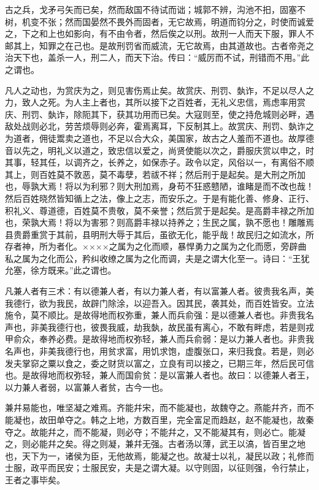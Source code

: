 \documentclass[]{article}
\begin{document}
古之兵，戈矛弓矢而已矣，然而敌国不待试而诎；城郭不辨，沟池不抇，固塞不树，机变不张；然而国晏然不畏外而固者，无它故焉，明道而钧分之，时使而诚爱之，下之和上也如影向，有不由令者，然后俟之以刑。故刑一人而天下服，罪人不邮其上，知罪之在己也。是故刑罚省而威流，无它故焉，由其道故也。古者帝尧之治天下也，盖杀一人，刑二人，而天下治。传曰：``威厉而不试，刑错而不用。''此之谓也。

凡人之动也，为赏庆为之，则见害伤焉止矣。故赏庆、刑罚、埶诈，不足以尽人之力，致人之死。为人主上者也，其所以接下之百姓者，无礼义忠信，焉虑率用赏庆、刑罚、埶诈，除阨其下，获其功用而已矣。大寇则至，使之持危城则必畔，遇敌处战则必北，劳苦烦辱则必奔，霍焉离耳，下反制其上。故赏庆、刑罚、埶诈之为道者，佣徒鬻卖之道也，不足以合大众，美国家，故古之人羞而不道也。故厚德音以先之，明礼义以道之，致忠信以爱之，尚贤使能以次之，爵服庆赏以申之，时其事，轻其任，以调齐之，长养之，如保赤子。政令以定，风俗以一，有离俗不顺其上，则百姓莫不敦恶，莫不毒孽，若祓不祥；然后刑于是起矣。是大刑之所加也，辱孰大焉！将以为利邪？则大刑加焉，身苟不狂惑戆陋，谁睹是而不改也哉！然后百姓晓然皆知循上之法，像上之志，而安乐之。于是有能化善、修身、正行、积礼义、尊道德，百姓莫不贵敬，莫不亲誉；然后赏于是起矣。是高爵丰禄之所加也，荣孰大焉！将以为害邪？则高爵丰禄以持养之；生民之属，孰不愿也！雕雕焉县贵爵重赏于其前，县明刑大辱于其后，虽欲无化，能乎哉！故民归之如流水，所存者神，所为者化。××××之属为之化而顺，暴悍勇力之属为之化而愿，旁辟曲私之属为之化而公，矜纠收缭之属为之化而调，夫是之谓大化至一。诗曰：``王犹允塞，徐方既来。''此之谓也。

凡兼人者有三术：有以德兼人者，有以力兼人者，有以富兼人者。彼贵我名声，美我德行，欲为我民，故辟门除涂，以迎吾入。因其民，袭其处，而百姓皆安。立法施令，莫不顺比。是故得地而权弥重，兼人而兵俞强：是以德兼人者也。非贵我名声也，非美我德行也，彼畏我威，劫我埶，故民虽有离心，不敢有畔虑，若是则戎甲俞众，奉养必费。是故得地而权弥轻，兼人而兵俞弱：是以力兼人者也。非贵我名声也，非美我德行也，用贫求富，用饥求饱，虚腹张口，来归我食。若是，则必发夫掌窌之粟以食之，委之财货以富之，立良有司以接之，已期三年，然后民可信也。是故得地而权弥轻，兼人而国俞贫：是以富兼人者也。故曰：以德兼人者王，以力兼人者弱，以富兼人者贫，古今一也。

兼幷易能也，唯坚凝之难焉。齐能幷宋，而不能凝也，故魏夺之。燕能幷齐，而不能凝也，故田单夺之。韩之上地，方数百里，完全富足而趋赵，赵不能凝也，故秦夺之。故能幷之，而不能凝，则必夺；不能幷之，又不能凝其有，则必亡。能凝之，则必能幷之矣。得之则凝，兼幷无强。古者汤以薄，武王以滈，皆百里之地也，天下为一，诸侯为臣，无他故焉，能凝之也。故凝士以礼，凝民以政；礼修而士服，政平而民安；士服民安，夫是之谓大凝。以守则固，以征则强，令行禁止，王者之事毕矣。
\end{document}
